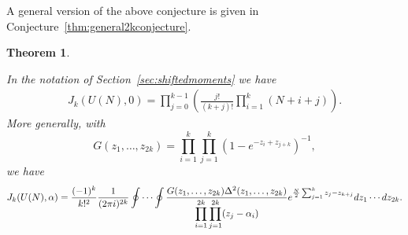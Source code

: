 \documentclass[12pt,letterpaper]{amsart}
\theoremstyle{plain}
\newtheorem{theorem}{Theorem}[section]
\theoremstyle{definition}
\theoremstyle{remark}
\numberwithin{equation}{subsection}
\numberwithin{theorem}{subsection}
\numberwithin{table}{subsection}
\begin{document}
A general version of the above conjecture is given in
Conjecture~\ref{thm:general2kconjecture}.


\begin{theorem} \label{thm:UN2k}

  In the notation of Section~\ref{sec:shiftedmoments} we have
\begin{eqnarray}
J_k(U(N),0) =\prod_{j=0}^{k-1} \left(\frac{j!}{(k+j)!}
\prod_{i=1}^{k}(N+i+j) \right). \end{eqnarray}
More generally, with 
$$
G(z_1,\dots,z_{2k})=\prod_{i=1}^{k}\prod_{j=1}^k (1-e^{-z_i+z_{j+k}})^{-1},
$$ 
we have
\begin{equation}
J_k(U(N),\alpha)  =  \frac{(-1)^{k}}{k!^2} \frac {1}{(2\pi i)^{2k}}
 \oint\cdots \oint \frac {
G(z_1,\dots,z_{2k})
\Delta^2(z_1,\ldots,z_{2k})} { \displaystyle \prod_{i=1}^{2k}
\prod_{j=1}^{2k} (z_j-\alpha_i)} 
e^{\frac{N}{2}
\sum_{j=1}^k z_j-z_{k+j} }dz_1\cdots dz_{2k}  . 
\end{equation}
\end{theorem}
\end{document}
